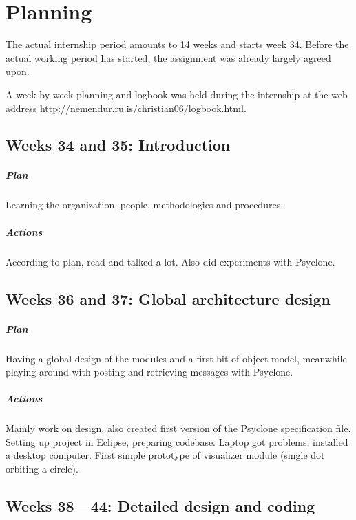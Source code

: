 \chapter{\label{cpt:planning}Planning}

The actual internship period amounts to 14 weeks and starts week 34. Before the
actual working period has started, the assignment was already largely agreed
upon.

A week by week planning and logbook was held during the internship at the web
address \url{http://nemendur.ru.is/christian06/logbook.html}.

\section{Weeks 34 and 35: Introduction}

\paragraph{Plan} Learning the organization, people, methodologies and
procedures.

\paragraph{Actions} According to plan, read and talked a lot. Also did
experiments with Psyclone.

\section{Weeks 36 and 37: Global architecture design}

\paragraph{Plan} Having a global design of the modules and a first bit of
object model, meanwhile playing around with posting and retrieving messages
with Psyclone.

\paragraph{Actions} Mainly work on design, also created first version of the
Psyclone specification file. Setting up project in Eclipse, preparing codebase.
Laptop got problems, installed a desktop computer. First simple prototype of
visualizer module (single dot orbiting a circle).

\section{Weeks 38---44: Detailed design and coding}

